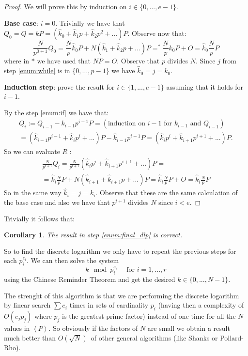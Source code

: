 \documentclass{article}
\DeclareMathOperator*{\eqb}{=}
\theoremstyle{plain}
\newtheorem{cor}[teo]{Corollary}
\theoremstyle{remark}
\theoremstyle{definition}
\begin{document}
\begin{proof}
	We will prove this by induction on $i \in \{ 0 ,..., e-1\}$.

	\textbf{Base case}: $i=0$. Trivially we have that $Q_0 = Q = kP = (\hat{k}_0 + \hat{k}_1p + \hat{k}_2p^2 + ...)P$. Observe now that:
	\begin{equation}
		\label{eq:prop:base}
		\frac{N}{p^{0+1}}Q_0 = \frac{N}{p}\hat{k}_0 P + N(\hat{k}_1 + \hat{k}_2p + ...)P \eqb^* \frac{N}{p}k_0 P + O = \hat{k}_0 \frac{N}{p} P
	\end{equation}
	where in $*$ we have used that $NP = O$. Observe that $p$ divides $N$. Since $j$ from step \ref{enum:while} is in $\{0,...,p-1\}$ we have $\hat{k}_0 = j = k_0$.

	\textbf{Induction step}: prove the result for $i \in \{1,...,e-1\}$ assuming that it holds for $i-1$. 

	By the step \ref{enum:if} we have that:
	\begin{multline*}
		Q_i := Q_{i-1} - k_{i-1} p^{i-1}P = (\text{induction on }i-1\text{ for } k_{i-1} \text{ and } Q_{i-1}) \\
		= (\hat{k}_{i-1}p^{i-1} + \hat{k}_{i}p^{i} + ... )P - \hat{k}_{i-1} p^{i-1}P = (\hat{k}_ip^i + \hat{k}_{i+1}p^{i+1} + ... )P.
	\end{multline*}
	So we can evaluate $R$ :
	\begin{multline*}
		\frac{N}{p^{i+1}}Q_i = \frac{N}{p^{i+1}}(\hat{k}_ip^i + \hat{k}_{i+1}p^{i+1} + ... )P = \\
		= \hat{k}_i \frac{N}{p} P + N(\hat{k}_{i+1} + \hat{k}_{i+1}p + ...)P= \hat{k}_i \frac{N}{p} P + O = \hat{k}_i \frac{N}{p} P 
	\end{multline*}
	So in the same way $\hat{k}_i = j = k_i$. Observe that these are the same calculation of the base case and also we have that $p^{i+1}$ divides $N$ since $i<e$. 
\end{proof}

Trivially it follows that:

\begin{cor}
	The result in step \ref{enum:final_dlp} is correct.
\end{cor}

So to find the discrete logarithm we only have to repeat the previous steps for each $p_i^{e_i}$. We can then solve the system 
\[
	k \mod p_i^{e_i} \quad \text{ for } i=1,...,r
\]
using the Chinese Reminder Theorem and get the desired $k \in \{0,...,N-1\}$. 

The strenght of this algorithm is that we are performing the discrete logarithm by linear search $\sum e_i$ times in sets of cardinality $p_i$ (having then a complexity of $O(e_j p_j)$ where $p_j$ is the greatest prime factor) instead of one time for all the $N$ values in $\left< P \right>$. So obviously if the factors of $N$ are small we obtain a result much better than $O(\sqrt{N})$ of other general algorithms (like Shanks or Pollard-Rho). 
\end{document}
